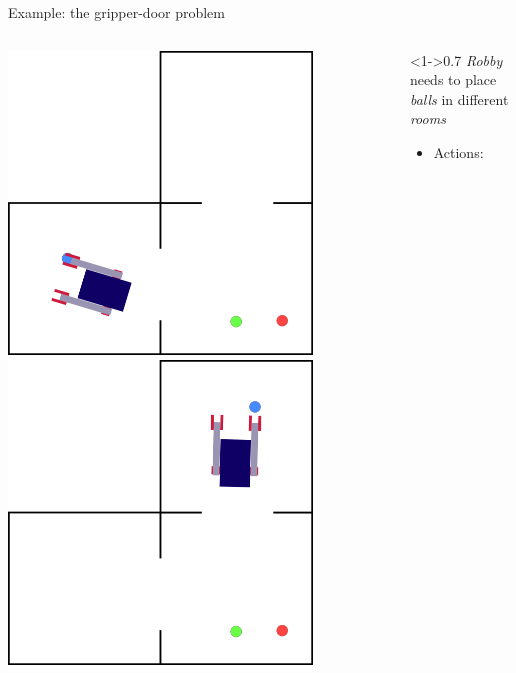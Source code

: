 \begin{frame}[fragile]{Example: the gripper-door problem}
\begin{columns}[c]
\begin{column}{0.3\textwidth}
\begin{overprint}
                \includegraphics[width = 0.8\textwidth]{images/3_rooms/gd_3_3.png}
                \includegraphics[width = 0.8\textwidth]{images/3_rooms/gd_3_6.png}
            \end{overprint}
        \end{column}
        \begin{column}<1->{0.7\textwidth}
            \textit{Robby} needs to place \textit{balls} in different \textit{rooms}
            \small
            \begin{itemize}
                \item Actions:

\end{itemize}
\end{column}
\end{columns}
\end{frame}
